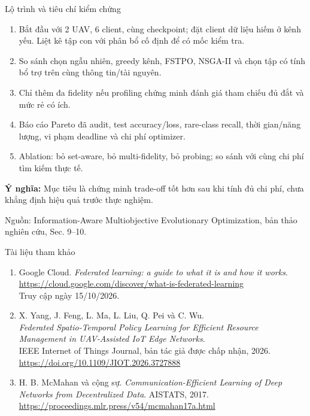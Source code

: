 \documentclass[10pt,aspectratio=43]{beamer}
\newcommand{\source}[1]{\par\vfill{\fontsize{5.8}{7}\selectfont\color{Muted}Nguồn: #1\par}}
\newcommand{\eqmeaning}[1]{\par\medskip\textcolor{HustRed}{\textbf{Ý nghĩa:}} #1\par}
\begin{document}
\begin{frame}[t]{Lộ trình và tiêu chí kiểm chứng}\relax
\small
\begin{enumerate}\item Bắt đầu với 2 UAV, 6 client, cùng checkpoint; đặt client dữ liệu hiếm ở kênh yếu. Liệt kê tập con với phân bổ cố định để có mốc kiểm tra.
\item So sánh chọn ngẫu nhiên, greedy kênh, FSTPO, NSGA-II và chọn tập có tính bổ trợ trên cùng thông tin/tài nguyên.
\item Chỉ thêm đa fidelity nếu profiling chứng minh đánh giá tham chiếu đủ đắt và mức rẻ có ích.
\item Báo cáo Pareto đã audit, test accuracy/loss, rare-class recall, thời gian/năng lượng, vi phạm deadline và chi phí optimizer.
\item Ablation: bỏ set-aware, bỏ multi-fidelity, bỏ probing; so sánh với cùng chi phí tìm kiếm thực tế.
\end{enumerate}
\eqmeaning{Mục tiêu là chứng minh trade-off tốt hơn sau khi tính đủ chi phí, chưa khẳng định hiệu quả trước thực nghiệm.}
\source{Information-Aware Multiobjective Evolutionary Optimization, bản thảo nghiên cứu, Sec. 9--10.}
\end{frame}

\begin{frame}[t]{Tài liệu tham khảo}
\relax
\small
\begin{enumerate}
\setlength{\itemsep}{.8em}
\item Google Cloud. \emph{Federated learning: a guide to what it is and how it works}.\\
{\scriptsize\url{https://cloud.google.com/discover/what-is-federated-learning}}\\
Truy cập ngày 15/10/2026.
\item X. Yang, J. Feng, L. Ma, L. Liu, Q. Pei và C. Wu.\\
\emph{Federated Spatio-Temporal Policy Learning for Efficient Resource Management in UAV-Assisted IoT Edge Networks}.\\
IEEE Internet of Things Journal, bản tác giả được chấp nhận, 2026.\\
{\scriptsize\url{https://doi.org/10.1109/JIOT.2026.3727888}}
\item H. B. McMahan và cộng sự. \emph{Communication-Efficient Learning of Deep Networks from Decentralized Data}. AISTATS, 2017.\\
{\scriptsize\url{https://proceedings.mlr.press/v54/mcmahan17a.html}}
\end{enumerate}
\end{frame}
\end{document}
